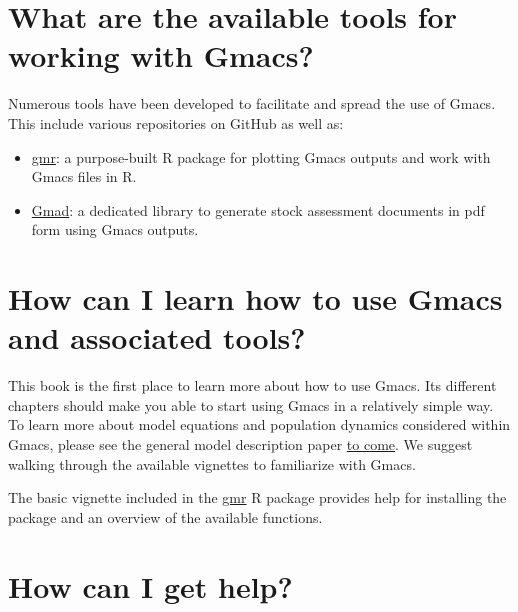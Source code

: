 \documentclass[
]{book}
\providecommand{\tightlist}{%
  \setlength{\itemsep}{0pt}\setlength{\parskip}{0pt}}
\begin{document}
\hypertarget{what-are-the-available-tools-for-working-with-gmacs}{%
\section*{What are the available tools for working with Gmacs?}\label{what-are-the-available-tools-for-working-with-gmacs}}

Numerous tools have been developed to facilitate and spread the use of Gmacs. This include various repositories on GitHub as well as:

\begin{itemize}
\tightlist
\item
  \href{https://github.com/seacode/gmacs/tree/develop/gmr}{gmr}: a purpose-built R package for plotting Gmacs outputs and work with Gmacs files in R.
\item
  \href{}{Gmad}: a dedicated library to generate stock assessment documents in pdf form using Gmacs outputs.
\end{itemize}

\hypertarget{how-can-i-learn-how-to-use-gmacs-and-associated-tools}{%
\section*{How can I learn how to use Gmacs and associated tools?}\label{how-can-i-learn-how-to-use-gmacs-and-associated-tools}}

This book is the first place to learn more about how to use Gmacs. Its different chapters should make you able to start using Gmacs in a relatively simple way. To learn more about model equations and population dynamics considered within Gmacs, please see the general model description paper \href{}{to come}. We suggest walking through the available vignettes to familiarize with Gmacs.

The basic vignette included in the \href{https://github.com/seacode/gmacs/tree/develop/gmr}{gmr} R package provides help for installing the package and an overview of the available functions.

\hypertarget{how-can-i-get-help}{%
\section*{How can I get help?}\label{how-can-i-get-help}}
\end{document}
